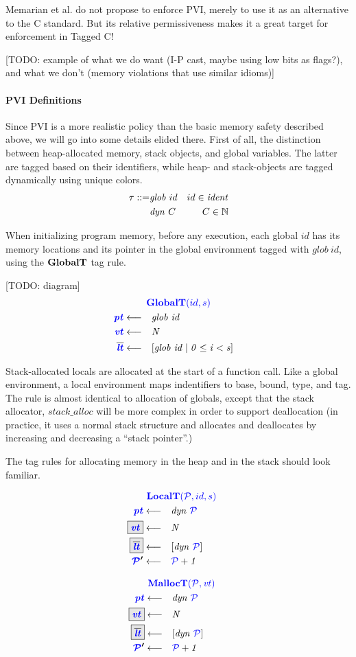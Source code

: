 \documentclass[acmsmall,review,anonymous]{acmart}\settopmatter{printfolios=true,printccs=false,printacmref=false}
\begin{document}
Memarian et al. do not propose to enforce PVI, merely to use it as an alternative to the
C standard. But its relative permissiveness makes it a great target for enforcement in Tagged C!

[TODO: example of what we do want (I-P cast, maybe using low bits as flags?),
  and what we don't (memory violations that use similar idioms)]

\paragraph*{PVI Definitions}

Since PVI is a more realistic policy than the basic memory safety described above,
we will go into some details elided there. First of all, the distinction between
heap-allocated memory, stack objects, and global variables. The latter are tagged
based on their identifiers, while heap- and stack-objects are tagged dynamically
using unique colors.
%
\begin{align*}
  \tau ::= & \mathit{glob} ~ id & id \in \mathit{ident} \\
  & \mathit{dyn} ~ C & C \in \mathbb{N} \\
\end{align*}

When initializing program memory, before any execution, each global \(id\) has its
memory locations and its pointer in the global environment tagged with \(\mathit{glob} ~ id\),
using the \(\mathbf{GlobalT}\) tag rule.

[TODO: diagram]
\[\begin{aligned}
\truledef{\globalt}
\settag{\pt}{\mathit{glob ~ id}}
\settag{\vt}{N}
\settag{\overline{\lt}}{\left[\mathit{glob} ~ id \mid 0 \leq i < s\right]}
\end{aligned}\]

Stack-allocated locals are allocated at the start of a function call. Like a global environment,
a local environment maps indentifiers to base, bound, type, and tag. The rule is almost identical
to allocation of globals, except that the stack allocator, \(\mathit{stack\_alloc}\) will be more
complex in order to support deallocation (in practice, it uses a normal stack structure and allocates
and deallocates by increasing and decreasing a ``stack pointer''.)

The tag rules for allocating memory in the heap and in the stack should look familiar.

\begin{minipage}{0.49\textwidth}
\[\begin{aligned}
\truledef{\localt}
\settag{\pt}{dyn ~ \PCT}
\settagopt{\vt}{N}
\settagopt{\overline{\lt}}{\left[dyn ~ \PCT\right]}
\settag{\PCT'}{\PCT+1}
\end{aligned}\]
\end{minipage}
\begin{minipage}{0.49\textwidth}
\[\begin{aligned}
\truledef{\malloct}
\settag{\pt}{dyn ~ \PCT}
\settagopt{\vt}{N}
\settagopt{\overline{\lt}}{\left[dyn ~ \PCT\right]}
\settag{\PCT'}{\PCT + 1}
\end{aligned}\]
\end{minipage}
\end{document}
